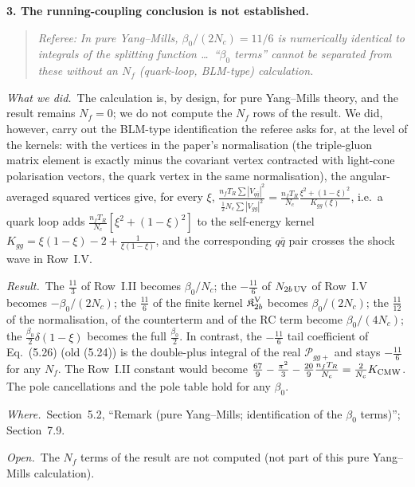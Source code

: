 \documentclass[a4paper,11pt]{article}
\newcommand{\point}[1]{\par\medskip\noindent\textbf{#1}\par}
\newcommand{\referee}[1]{\begin{quote}\small\emph{Referee:} \emph{#1}\end{quote}}
\newcommand{\done}{\par\noindent\emph{What we did.}\ }
\newcommand{\result}{\par\noindent\emph{Result.}\ }
\newcommand{\where}{\par\noindent\emph{Where.}\ }
\newcommand{\open}{\par\noindent\emph{Open.}\ }
\begin{document}
\point{3. The running-coupling conclusion is not established.}

\referee{In pure Yang--Mills, $\beta_0/(2N_c)=11/6$ is numerically identical to integrals of the splitting function \dots\ ``$\beta_0$ terms'' cannot be separated from these without an $N_f$ (quark-loop, BLM-type) calculation.}
\done The calculation is, by design, for pure Yang--Mills theory, and the result remains $N_f=0$; we do not compute the $N_f$ rows of the result. We did, however, carry out the BLM-type identification the referee asks for, at the level of the kernels: with the vertices in the paper's normalisation (the triple-gluon matrix element is exactly minus the covariant vertex contracted with light-cone polarisation vectors, the quark vertex in the same normalisation), the angular-averaged squared vertices give, for every $\xi$, $\frac{n_fT_R\sum|V_{q\bar q}|^2}{\frac12N_c\sum|V_{gg}|^2}=\frac{n_fT_R}{N_c}\frac{\xi^2+(1-\xi)^2}{K_{gg}(\xi)}$, i.e.\ a quark loop adds $\frac{n_fT_R}{N_c}[\xi^2+(1-\xi)^2]$ to the self-energy kernel $K_{gg}=\xi(1-\xi)-2+\frac{1}{\xi(1-\xi)}$, and the corresponding $q\bar q$ pair crosses the shock wave in Row~I.V.
\result The $\frac{11}{3}$ of Row~I.II becomes $\beta_0/N_c$; the $-\frac{11}{6}$ of $N_{2b\,\rm UV}$ of Row~I.V becomes $-\beta_0/(2N_c)$; the $\frac{11}{6}$ of the finite kernel $\mathfrak K^{\rm V}_{2b}$ becomes $\beta_0/(2N_c)$; the $\frac{11}{12}$ of the normalisation, of the counterterm and of the RC term become $\beta_0/(4N_c)$; the $\frac{\beta_0}{2}\delta(1-\xi)$ becomes the full $\frac{\beta_0}{2}$. In contrast, the $-\frac{11}{6}$ tail coefficient of Eq.~(5.26) (old (5.24)) is the double-plus integral of the real $\mathcal P_{gg+}$ and stays $-\frac{11}{6}$ for any $N_f$. The Row~I.II constant would become $\frac{67}{9}-\frac{\pi^2}{3}-\frac{20}{9}\frac{n_fT_R}{N_c}=\frac{2}{N_c}K_{\rm CMW}$. The pole cancellations and the pole table hold for any $\beta_0$.
\where Section~5.2, ``Remark (pure Yang--Mills; identification of the $\beta_0$ terms)''; Section~7.9.
\open The $N_f$ terms of the result are not computed (not part of this pure Yang--Mills calculation).
\end{document}
